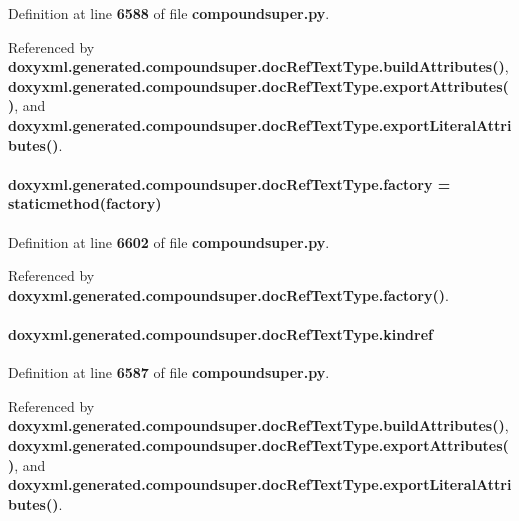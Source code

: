 Definition at line {\bf 6588} of file {\bf compoundsuper.\+py}.



Referenced by {\bf doxyxml.\+generated.\+compoundsuper.\+doc\+Ref\+Text\+Type.\+build\+Attributes()}, {\bf doxyxml.\+generated.\+compoundsuper.\+doc\+Ref\+Text\+Type.\+export\+Attributes()}, and {\bf doxyxml.\+generated.\+compoundsuper.\+doc\+Ref\+Text\+Type.\+export\+Literal\+Attributes()}.

\paragraph[{factory}]{\setlength{\rightskip}{0pt plus 5cm}doxyxml.\+generated.\+compoundsuper.\+doc\+Ref\+Text\+Type.\+factory = staticmethod(factory)\hspace{0.3cm}{\ttfamily [static]}}\label{classdoxyxml_1_1generated_1_1compoundsuper_1_1docRefTextType_ac4f95c107db74f446fe695503e02f555}


Definition at line {\bf 6602} of file {\bf compoundsuper.\+py}.



Referenced by {\bf doxyxml.\+generated.\+compoundsuper.\+doc\+Ref\+Text\+Type.\+factory()}.

\paragraph[{kindref}]{\setlength{\rightskip}{0pt plus 5cm}doxyxml.\+generated.\+compoundsuper.\+doc\+Ref\+Text\+Type.\+kindref}\label{classdoxyxml_1_1generated_1_1compoundsuper_1_1docRefTextType_a54ec4774777c62ad1e0c9188a9246966}


Definition at line {\bf 6587} of file {\bf compoundsuper.\+py}.



Referenced by {\bf doxyxml.\+generated.\+compoundsuper.\+doc\+Ref\+Text\+Type.\+build\+Attributes()}, {\bf doxyxml.\+generated.\+compoundsuper.\+doc\+Ref\+Text\+Type.\+export\+Attributes()}, and {\bf doxyxml.\+generated.\+compoundsuper.\+doc\+Ref\+Text\+Type.\+export\+Literal\+Attributes()}.

